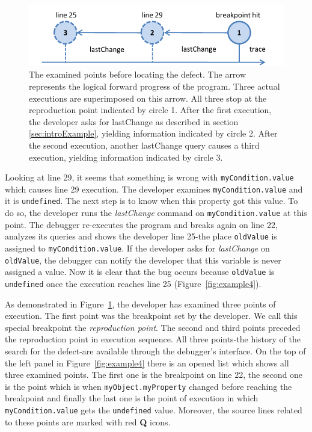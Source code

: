 \documentclass{sig-alternate}
\begin{document}
\begin{figure}[htp]
\centering 

\includegraphics [width=.48\textwidth]{5-example-points.pdf} 
\caption{The examined points before locating the defect. The arrow represents the logical forward progress of the program. Three actual executions are superimposed on this arrow. All three stop at the reproduction point indicated by circle 1. After the first execution, the developer asks for lastChange as described in section \ref{sec:introExample}, yielding information  indicated by circle 2. After the second execution, another lastChange query causes a third execution, yielding information indicated by circle 3.}
\label{fig:example-points}
\end{figure}


Looking at line 29, it seems that something is wrong with
\texttt{myCondition.value} which causes line 29 execution. The
developer examines \texttt{myCondition.value} and it is
\texttt{undefined}. The next step is to know when this property got
this value. To do so, the developer runs the \textit{lastChange} command
on \texttt{myCondition.value} at this point. The debugger re-executes the
program and breaks again on line 22, analyzes its queries and shows the developer line 25-the
place \texttt{oldValue} is assigned to
\texttt{myCondition.value}. If the developer asks for \textit{lastChange} on \texttt{oldValue}, 
the debugger can notify the developer that this variable is never assigned a value.
 Now it is clear that the bug occurs because \texttt{oldValue} is
\texttt{undefined} once the execution reaches line 25 (Figure~\ref{fig:example4}).


As demonstrated in Figure~\ref{fig:example-points}, the developer has
examined three points of execution. The first point  was the breakpoint set by the developer. 
We call this special breakpoint the \textit{reproduction point}.
The second and third points preceded the reproduction point in execution sequence.
All three points-the history
of the search for the defect-are available through the debugger's
interface. On the top of the left panel in Figure~\ref{fig:example4}
there is an opened list which shows all three examined points. The
first one is the breakpoint on line 22, the second one is the point
which is when \texttt{myObject.myProperty} changed before
reaching the breakpoint and finally the last one is the point of
execution in which \texttt{myCondition.value} gets the
\texttt{undefined} value. Moreover, the source lines related to these
points are marked with red \textbf{Q} icons.
\end{document}
